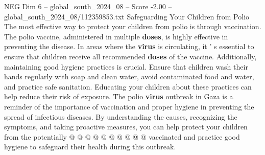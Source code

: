 \begin{textsample}{NEG Dim 6 – global\_south\_2024\_08 – Score -2.00 – global\_south\_2024\_08/112359853.txt}
Safeguarding Your Children from Polio The most effective way to protect your children from polio is through vaccination.
The polio vaccine, administered in multiple \textbf{doses}, is highly effective in preventing the disease.
In areas where the \textbf{virus} is circulating, it ' s essential to ensure that children receive all recommended \textbf{doses} of the vaccine.
Additionally, maintaining good hygiene practices is crucial.
Ensure that children wash their hands regularly with soap and clean water, avoid contaminated food and water, and practice safe sanitation.
Educating your children about these practices can help reduce their risk of exposure.
The polio \textbf{virus} outbreak in Gaza is a reminder of the importance of vaccination and proper hygiene in preventing the spread of infectious diseases.
By understanding the causes, recognizing the symptoms, and taking proactive measures, you can help protect your children from the potentially @ @ @ @ @ @ @ @ @ @ vaccinated and practice good hygiene to safeguard their health during this outbreak.

\end{textsample}
